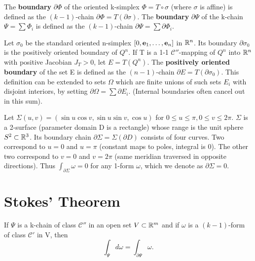The \textbf{boundary} $\partial \Phi$ of the oriented k-simplex $\Phi
= T \circ \sigma$ (where $\sigma$ is affine) is defined as the
$(k-1)$-chain $\partial \Phi = T(\partial \sigma)$.
The \textbf{boundary} $\partial \Psi$ of the k-chain $\Psi = \sum
\Phi_i$ is defined as the $(k-1)$-chain $\partial \Psi = \sum \partial \Phi_i$.

\begin{remark}
  \label{rem:chap10:pos_oriented_boundary_set}
  Let $\sigma_0$ be the standard oriented n-simplex $[0, \mathbf{e}_1,
  \dots, \mathbf{e}_n]$ in $\mathbb{R}^n$. Its boundary $\partial \sigma_0$ is
  the positively oriented boundary of $Q^n$.
  If T is a 1-1 $\mathcal{C}''$-mapping of $Q^n$ into $\mathbb{R}^n$ with
  positive Jacobian $J_T > 0$, let $E = T(Q^n)$. The
  \textbf{positively oriented boundary} of the set E is defined as
  the $(n-1)$-chain $\partial E = T(\partial \sigma_0)$. This
  definition can be extended to sets $\Omega$ which are finite unions
  of such sets $E_i$ with disjoint interiors, by setting $\partial
  \Omega = \sum \partial E_i$. (Internal boundaries often cancel out
  in this sum).
\end{remark}

\begin{example}
  \label{ex:chap10:sphere_boundary}
  Let $\Sigma(u, v) = (\sin u \cos v, \sin u \sin v, \cos u)$ for $0
  \le u \le \pi, 0 \le v \le 2\pi$. $\Sigma$ is a 2-surface
  (parameter domain D is a rectangle) whose range is the unit sphere
  $S^2 \subset \mathbb{R}^3$. Its boundary chain $\partial \Sigma =
  \Sigma(\partial D)$ consists of four curves. Two correspond to
  $u=0$ and $u=\pi$ (constant maps to poles, integral is 0). The
  other two correspond to $v=0$ and $v=2\pi$ (same meridian traversed
  in opposite directions). Thus $\int_{\partial \Sigma} \omega = 0$
  for any 1-form $\omega$, which we denote as $\partial \Sigma = 0$.
\end{example}

\section{Stokes' Theorem}

\begin{theorem}
  \label{thm:chap10:stokes_theorem}
  If $\Psi$ is a k-chain of class $\mathcal{C}''$ in an open set $V
  \subset \mathbb{R}^m$ and if $\omega$ is a $(k-1)$-form of class
  $\mathcal{C}'$ in V, then
  \[
    \int_\Psi d\omega = \int_{\partial \Psi} \omega.
  \]
\end{theorem}

